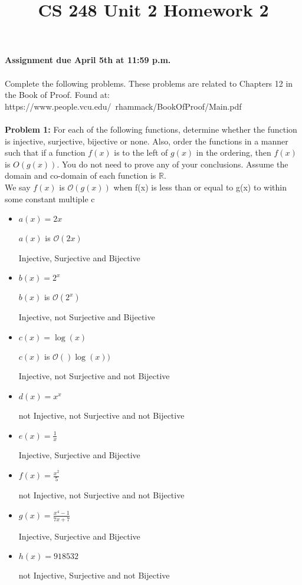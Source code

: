 \documentclass[12pt]{article}
\title{CS 248 Unit 2 Homework 2}
\def\R{\mathbb R} %
\begin{document}
\textbf{Assignment due April 5th at 11:59 p.m. \\ \\
}Complete the following problems. These problems are related to Chapters 12 in the Book of Proof. Found at: \\ https://www.people.vcu.edu/~rhammack/BookOfProof/Main.pdf \\ \\

{\bf Problem 1:} For each of the following functions, determine whether the function is injective, surjective, bijective or none. Also, order the functions in a manner such that if a function $f(x)$ is to the left of $g(x)$ in the ordering, then $f(x)$ is $O(g(x)).$ You do not need to prove any of your conclusions. Assume the domain and co-domain of each function is $\R$.\\

We say $f(x)$ is $\mathcal{O}(g(x))$ when f(x) is less than or
equal to g(x) to within some constant multiple c

\begin{itemize}

    \item $a(x) = 2x$
    
    $a(x)$ is $\mathcal{O}(2x)$
    
    Injective, Surjective and Bijective

    \item $b(x) = 2^x$
    
    $b(x)$ is $\mathcal{O}(2^x)$
    
    Injective, not Surjective and Bijective

    \item $c(x) = \log(x)$
    
    $c(x)$ is $\mathcal{O}()\log(x))$
    
    Injective, not Surjective and not Bijective

    \item $d(x) = x^x$
    
    not Injective, not Surjective and not Bijective

    \item $e(x) = \frac{1}{x}$
    
    Injective, Surjective and Bijective

    \item $f(x) = \frac{x^2}{5}$
    
    not Injective, not Surjective and not Bijective

    \item $g(x) = \frac{x^4-1}{7x+7}$
    
    Injective, Surjective and Bijective

    \item $h(x) = 918532$
    
    not Injective, Surjective and not Bijective

\end{itemize} 
\end{document}
